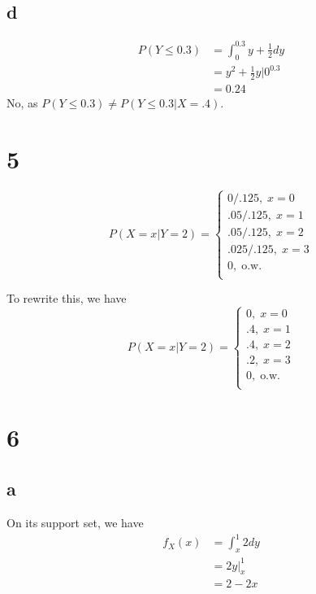 \documentclass[10pt]{article}
\begin{document}
\subsection*{d}
\begin{align*}
    P(Y\le0.3)&=\int_0^{0.3} y+\frac{1}{2}dy\\
    &= y^2 + \frac{1}{2}y \Bigr |0^{0.3}\\
    &=0.24
\end{align*}
No, as $P(Y\le 0.3) \neq P(Y\le0.3|X=.4).$

\section*{5}
\begin{equation*}
    P(X=x|Y=2)=\begin{cases}
        0/.125,\; x=0\\
        .05/.125,\; x=1\\
        .05/.125,\; x=2\\
        .025/.125,\; x=3\\
        0,\; \text{o.w.}\\
    \end{cases}
\end{equation*}

To rewrite this, we have
\begin{equation*}
    P(X=x|Y=2)=\begin{cases}
        0,\; x=0\\
        .4,\; x=1\\
        .4,\; x=2\\
        .2,\; x=3\\
        0,\; \text{o.w.}\\
    \end{cases}
\end{equation*}

\section*{6}
\subsection*{a}

On its support set, we have
\begin{align*}
    f_X(x) &= \int_x^1 2dy\\
    &= 2y \Bigr |_x^1\\
    &= 2 - 2x
\end{align*}
\end{document}
